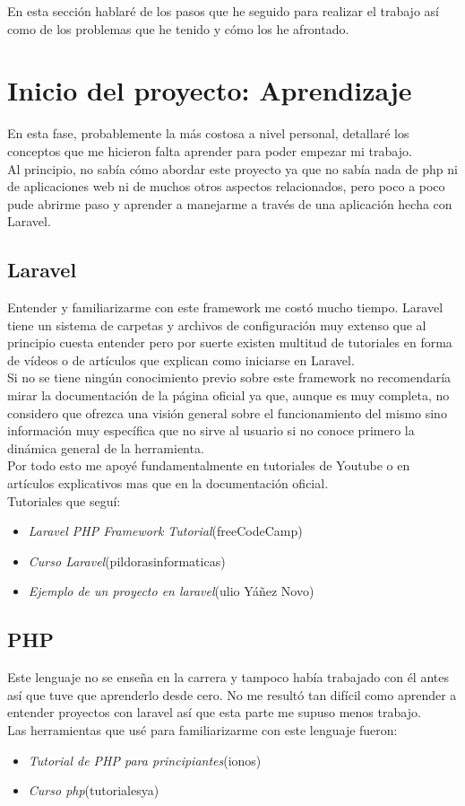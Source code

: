 En esta sección hablaré de los pasos que he seguido para realizar el trabajo así como de los problemas que he tenido y cómo los he afrontado. 
\section{Inicio del proyecto: Aprendizaje}
En esta fase, probablemente la más costosa a nivel personal, detallaré los conceptos que me hicieron falta aprender para poder empezar mi trabajo.\\
Al principio, no sabía cómo abordar este proyecto ya que no sabía nada de php ni de aplicaciones web ni de muchos otros aspectos relacionados, pero poco a poco pude abrirme paso y aprender a manejarme a través de una aplicación hecha con Laravel.\\
\subsection{Laravel} 
Entender y familiarizarme con este framework me costó mucho tiempo. Laravel tiene un sistema de carpetas y archivos de configuración muy extenso que al principio cuesta entender pero por suerte existen multitud de tutoriales en forma de vídeos o de artículos que explican como iniciarse en Laravel.\\
Si no se tiene ningún conocimiento previo sobre este framework no recomendaría mirar la documentación de la página oficial ya que, aunque es muy completa, no considero que ofrezca una visión general sobre el funcionamiento del mismo sino información muy específica que no sirve al usuario si no conoce primero la dinámica general de la herramienta.\\
Por todo esto me apoyé fundamentalmente en tutoriales de Youtube o en artículos explicativos mas que en la documentación oficial.\\
Tutoriales que seguí:
\begin{itemize}
    \item \textit{Laravel PHP Framework Tutorial}(freeCodeCamp)\cite{TutorialLaravel}
    \item \textit{Curso Laravel}(pildorasinformaticas)\cite{TutorialLaravel2}
    \item \textit{Ejemplo de un proyecto en laravel}(ulio Yáñez Novo)\cite{PrimerProyecto}
\end{itemize}
\subsection{PHP} 
Este lenguaje no se enseña en la carrera y tampoco había trabajado con él antes así que tuve que aprenderlo desde cero. No me resultó tan difícil como aprender a entender proyectos con laravel así que esta parte me supuso menos trabajo.\\
Las herramientas que usé para familiarizarme con este lenguaje fueron:
\begin{itemize}
    \item \textit{Tutorial de PHP para principiantes}(ionos)\cite{TutorialPHP}
    \item \textit{Curso php}(tutorialesya)\cite{CursoPHP} 
\end{itemize}
